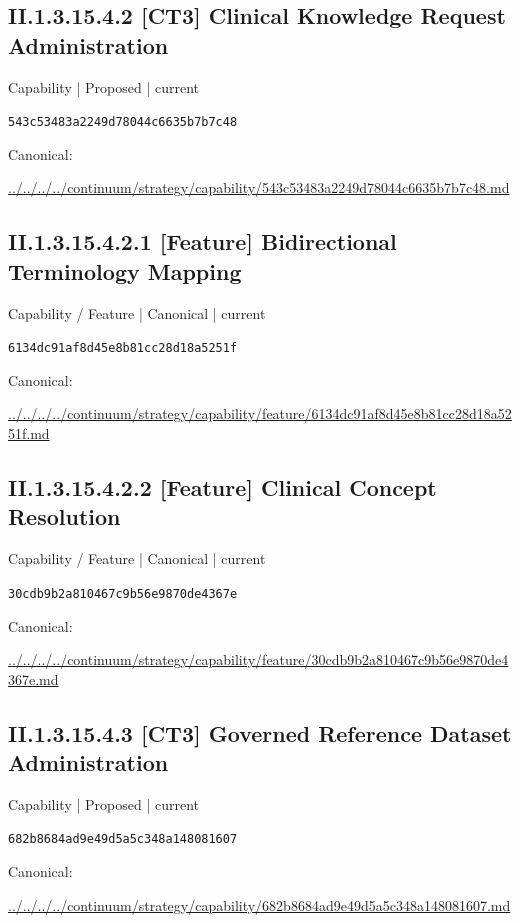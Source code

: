 \documentclass[10pt,a4paper]{article}
\begin{document}
\subsection*{II.1.3.15.4.2 [CT3] Clinical Knowledge Request Administration}
{\small Capability | Proposed | current}\par
\texttt{543c53483a2249d78044c6635b7b7c48}\par
Canonical: \par
{\footnotesize\url{../../../../continuum/strategy/capability/543c53483a2249d78044c6635b7b7c48.md}}\par
\subsection*{II.1.3.15.4.2.1 [Feature] Bidirectional Terminology Mapping}
{\small Capability / Feature | Canonical | current}\par
\texttt{6134dc91af8d45e8b81cc28d18a5251f}\par
Canonical: \par
{\footnotesize\url{../../../../continuum/strategy/capability/feature/6134dc91af8d45e8b81cc28d18a5251f.md}}\par
\subsection*{II.1.3.15.4.2.2 [Feature] Clinical Concept Resolution}
{\small Capability / Feature | Canonical | current}\par
\texttt{30cdb9b2a810467c9b56e9870de4367e}\par
Canonical: \par
{\footnotesize\url{../../../../continuum/strategy/capability/feature/30cdb9b2a810467c9b56e9870de4367e.md}}\par
\subsection*{II.1.3.15.4.3 [CT3] Governed Reference Dataset Administration}
{\small Capability | Proposed | current}\par
\texttt{682b8684ad9e49d5a5c348a148081607}\par
Canonical: \par
{\footnotesize\url{../../../../continuum/strategy/capability/682b8684ad9e49d5a5c348a148081607.md}}\par
\end{document}
